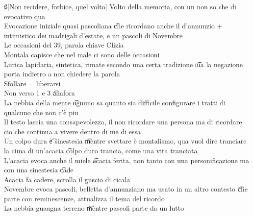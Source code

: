 \documentclass[12pt]{article}
\begin{document}
\ss[Non recidere, forbice, quel volto]
Volto della memoria, con un non so che di evocativo qua \\
Evocazione iniziale quasi pascoliana \t che ricordano anche il d'annunzio + intimistico dei madrigali d'estate, e un pascoli di Novembre \\
Le occasioni del 39, parola chiave Clizia \\
Montala capisce che nel male ci sono delle occasioni \\
Liirica lapidaria, sintetica, rimate secondo una certa tradizione \t ma la negazione porta indietro a non chiedere la parola \\
Sfollare = liberarsi \\
Non verso 1 e 3 \t anafora \\
La nebbia della mente \t ognuno sa quanto sia difficile configurare i tratti di qualcuno che non c'è piu \\
Il testo lascia una consapevolezza, il non ricordare una persona ma di ricordare cio che continua a vivere dentro di me di essa \\
Un colpo dura \t è sinestesia \t mentre svettare è montalismo, qua vuol dire tranciare la cima di un'acacia \t colpo duro trancia, come una vita tranciata \\
L'acacia evoca anche il miele \t acacia ferita, non tanto con una personificazione ma con una sinestesia \t cade \\
Acacia fa cadere, scrolla il guscio di cicala \\
Novembre evoca pascoli, belletta d'annunziano ma usato in un altro contesto \t che parte con reminescenze, attualizza il tema del ricordo \\
La nebbia guaagna terreno \t mentre pascoli parte da un lutto
\end{document}
